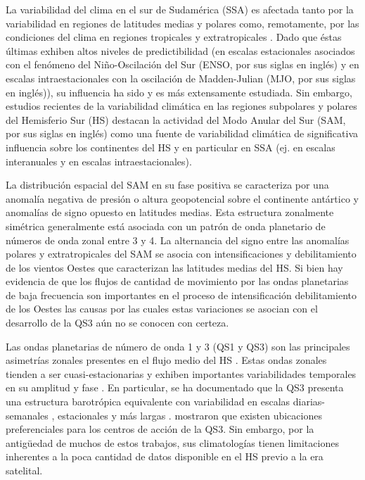 \documentclass[spanish,a4paper,12pt,oneside]{book}
\begin{document}
La variabilidad del clima en el sur de Sudamérica (SSA) es afectada
tanto por la variabilidad en regiones de latitudes medias y polares
como, remotamente, por las condiciones del clima en regiones tropicales
y extratropicales \citep[ej.][]{Vera2006}. Dado que éstas últimas
exhiben altos niveles de predictibilidad (en escalas estacionales
asociados con el fenómeno del Niño-Oscilación del Sur (ENSO, por sus
siglas en inglés) y en escalas intraestacionales con la oscilación de
Madden-Julian (MJO, por sus siglas en inglés)), su influencia ha sido y
es más extensamente estudiada. Sin embargo, estudios recientes de la
variabilidad climática en las regiones subpolares y polares del
Hemisferio Sur (HS) destacan la actividad del Modo Anular del Sur (SAM,
por sus siglas en inglés) como una fuente de variabilidad climática de
significativa influencia sobre los continentes del HS y en particular en
SSA (ej. \citet{Silvestri2009} en escalas interanuales y
\citet{Alvarez2014} en escalas intraestacionales).

La distribución espacial del SAM en su fase positiva se caracteriza por
una anomalía negativa de presión o altura geopotencial sobre el
continente antártico y anomalías de signo opuesto en latitudes medias.
Esta estructura zonalmente simétrica generalmente está asociada con un
patrón de onda planetario de números de onda zonal entre 3 y 4. La
alternancia del signo entre las anomalías polares y extratropicales del
SAM se asocia con intensificaciones y debilitamiento de los vientos
Oestes que caracterizan las latitudes medias del HS. Si bien hay
evidencia de que los flujos de cantidad de movimiento por las ondas
planetarias de baja frecuencia son importantes en el proceso de
intensificación debilitamiento de los Oestes
\citep{Lorenz2001, Simpson2013} las causas por las cuales estas
variaciones se asocian con el desarrollo de la QS3 aún no se conocen con
certeza.

Las ondas planetarias de número de onda 1 y 3 (QS1 y QS3) son las
principales asimetrías zonales presentes en el flujo medio del HS
\citep{Loon1972, Trenberth1980a}. Estas ondas zonales tienden a ser
cuasi-estacionarias y exhiben importantes variabilidades temporales en
su amplitud y fase \citep{Loon1972}. En particular, se ha documentado
que la QS3 presenta una estructura barotrópica equivalente con
variabilidad en escalas diarias-semanales \citep{Kidson1988},
estacionales \citep{Mo1985} y más largas \citep{Karoly1989}.
\citet{Mo1985} mostraron que existen ubicaciones preferenciales para los
centros de acción de la QS3. Sin embargo, por la antigüedad de muchos de
estos trabajos, sus climatologías tienen limitaciones inherentes a la
poca cantidad de datos disponible en el HS previo a la era satelital.
\end{document}
